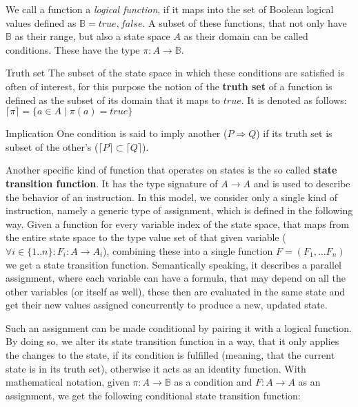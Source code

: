 We call a function a \textit{logical function}, if it maps into the set of Boolean logical values defined as $\mathbb{B} = {true , false}$. A subset of these functions, that not only have $\mathbb{B}$ as their range, but also a state space $A$ as their domain can be called conditions. These have the type $\pi : A \to \mathbb{B}$.

\begin{definition}{Truth set}
\label{def:truth-set}
The subset of the state space in which these conditions are satisfied is often of interest, for this purpose the notion of the \textbf{truth set} of a function is defined as the subset of its domain that it maps to $true$. It is denoted as follows: $\lceil \pi \rceil = \{a \in A \;|\; \pi(a) = true\}$
\end{definition}

\begin{definition}{Implication}
\label{def:implication}
One condition is said to imply another ($P \Rightarrow Q$) if its truth set is subset of the other's ($\lceil P \rceil \subset \lceil Q \rceil$).
\end{definition}

Another specific kind of function that operates on states is the so called \textbf{state transition function}. It has the type signature of $A \to A$ and is used to describe the behavior of an instruction. In this model, we consider only a single kind of instruction, namely a generic type of assignment, which is defined in the following way. Given a function for every variable index of the state space, that maps from the entire state space to the type value set of that given variable ($\forall i \in \{1..n\} : F_i : A \to A_i$), combining these into a single function $F = (F_1, \ldots F_n)$ we get a state transition function. Semantically speaking, it describes a parallel assignment, where each variable can have a formula, that may depend on all the other variables (or itself as well), these then are evaluated in the same state and get their new values assigned concurrently to produce a new, updated state.

Such an assignment can be made conditional by pairing it with a logical function. By doing so, we alter its state transition function in a way, that it only applies the changes to the state, if its condition is fulfilled (meaning, that the current state is in its truth set), otherwise it acts as an identity function. With mathematical notation, given $\pi : A \to \mathbb{B}$ as a condition and $F : A \to A$ as an assignment, we get the following conditional state transition function:

